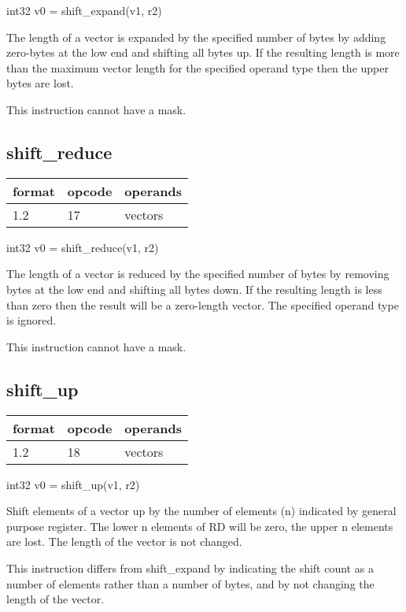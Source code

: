 \documentclass[forwardcom.tex]{subfiles}
\begin{document}
int32 v0 = shift\_expand(v1, r2)
\vv

The length of a vector is expanded by the specified number of bytes by adding zero-bytes at the low end and shifting all bytes up. If the resulting length is more than the maximum vector length for the specified operand type then the upper bytes are lost.
\vv

This instruction cannot have a mask.
\vv

\subsection{shift\_reduce}
\label{table:shiftReduceInstruction}
\begin{tabular}{|p{12mm}|p{15mm}|p{100mm}|}
\hline
\bfseries format & \bfseries opcode & \bfseries operands \\ \hline
1.2 & 17 & vectors \\ \hline
\end{tabular}
\vv

int32 v0 = shift\_reduce(v1, r2)
\vv

The length of a vector is reduced by the specified number of bytes by removing bytes at the low end and shifting all bytes down. If the resulting length is less than zero then the result will be a zero-length vector. The specified operand type is ignored.
\vv

This instruction cannot have a mask.
\vv

\subsection{shift\_up}
\label{table:shiftUpInstruction}
\begin{tabular}{|p{12mm}|p{15mm}|p{100mm}|}
\hline
\bfseries format & \bfseries opcode & \bfseries operands \\ \hline
1.2 & 18 & vectors \\ \hline
\end{tabular}
\vv

int32 v0 = shift\_up(v1, r2)
\vv

Shift elements of a vector up by the number of elements (n) indicated by general purpose register. 
The lower n elements of RD will be zero, the upper n elements are lost. The length of the vector is not changed.
\vv

This instruction differs from shift\_expand by indicating the shift count as a number of elements rather than a number of bytes, and by not changing the length of the vector.
\vv
\end{document}

